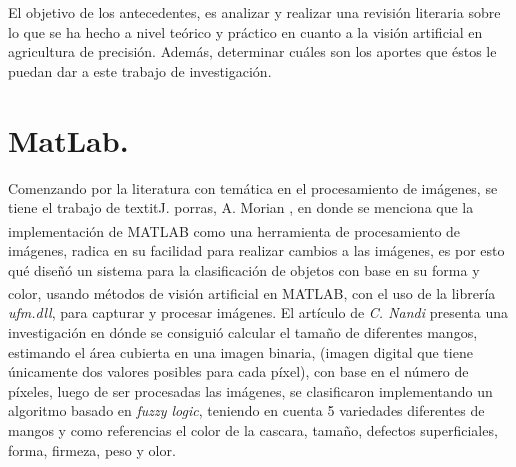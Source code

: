 	El objetivo de los antecedentes, es analizar y realizar una revisión literaria sobre lo  que  se  ha hecho  a  nivel  teórico  y  práctico  en  cuanto a  la visión artificial en agricultura de precisión.  Además,  determinar  cuáles son los aportes que éstos le puedan dar a este trabajo de investigación.


\section{MatLab.}

	Comenzando por la literatura con temática en el procesamiento de imágenes, se tiene el trabajo de textit{J. porras, A. Morian} \cite{article3}, en donde se menciona que la implementación de MATLAB\textsuperscript{\textregistered} como una herramienta de procesamiento de imágenes, radica en su facilidad para realizar cambios a las imágenes, es por esto qué diseñó un sistema para la clasificación de objetos con base en su forma y color, usando métodos de visión artificial en MATLAB\textsuperscript{\textregistered}, con el uso de la librería \textit{ufm.dll}, para capturar y procesar imágenes. El artículo de \textit{C. Nandi} \cite{inproceedings} presenta una investigación en dónde se consiguió calcular el tamaño de diferentes mangos, estimando el área cubierta en una imagen binaria, (imagen digital que tiene únicamente dos valores posibles para cada píxel), con base en el número de píxeles, luego de ser procesadas las imágenes, se clasificaron implementando un algoritmo basado en \textit{fuzzy logic}, teniendo en cuenta 5 variedades diferentes de mangos y como referencias el color de la cascara, tamaño, defectos superficiales, forma, firmeza, peso y olor.\\

